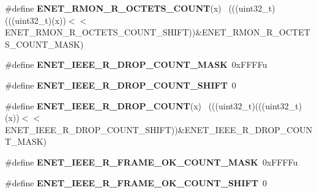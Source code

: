 \begin{DoxyCompactItemize}
\item 
\hypertarget{group___e_n_e_t___register___masks_ga1688acf267de0ee29e9a179f6f59c606}{}\#define {\bfseries E\+N\+E\+T\+\_\+\+R\+M\+O\+N\+\_\+\+R\+\_\+\+O\+C\+T\+E\+T\+S\+\_\+\+C\+O\+U\+N\+T}(x)                        ~(((uint32\+\_\+t)(((uint32\+\_\+t)(x))$<$$<$E\+N\+E\+T\+\_\+\+R\+M\+O\+N\+\_\+\+R\+\_\+\+O\+C\+T\+E\+T\+S\+\_\+\+C\+O\+U\+N\+T\+\_\+\+S\+H\+I\+F\+T))\&E\+N\+E\+T\+\_\+\+R\+M\+O\+N\+\_\+\+R\+\_\+\+O\+C\+T\+E\+T\+S\+\_\+\+C\+O\+U\+N\+T\+\_\+\+M\+A\+S\+K)\label{group___e_n_e_t___register___masks_ga1688acf267de0ee29e9a179f6f59c606}

\item 
\hypertarget{group___e_n_e_t___register___masks_ga40514ce83587f1cd466ecbe7b007e571}{}\#define {\bfseries E\+N\+E\+T\+\_\+\+I\+E\+E\+E\+\_\+\+R\+\_\+\+D\+R\+O\+P\+\_\+\+C\+O\+U\+N\+T\+\_\+\+M\+A\+S\+K}~0x\+F\+F\+F\+Fu\label{group___e_n_e_t___register___masks_ga40514ce83587f1cd466ecbe7b007e571}

\item 
\hypertarget{group___e_n_e_t___register___masks_gadfe517b4bb1358a8934a04c3bfe94d9d}{}\#define {\bfseries E\+N\+E\+T\+\_\+\+I\+E\+E\+E\+\_\+\+R\+\_\+\+D\+R\+O\+P\+\_\+\+C\+O\+U\+N\+T\+\_\+\+S\+H\+I\+F\+T}~0\label{group___e_n_e_t___register___masks_gadfe517b4bb1358a8934a04c3bfe94d9d}

\item 
\hypertarget{group___e_n_e_t___register___masks_gaaa3224079808337c73c1441256aee44f}{}\#define {\bfseries E\+N\+E\+T\+\_\+\+I\+E\+E\+E\+\_\+\+R\+\_\+\+D\+R\+O\+P\+\_\+\+C\+O\+U\+N\+T}(x)                            ~(((uint32\+\_\+t)(((uint32\+\_\+t)(x))$<$$<$E\+N\+E\+T\+\_\+\+I\+E\+E\+E\+\_\+\+R\+\_\+\+D\+R\+O\+P\+\_\+\+C\+O\+U\+N\+T\+\_\+\+S\+H\+I\+F\+T))\&E\+N\+E\+T\+\_\+\+I\+E\+E\+E\+\_\+\+R\+\_\+\+D\+R\+O\+P\+\_\+\+C\+O\+U\+N\+T\+\_\+\+M\+A\+S\+K)\label{group___e_n_e_t___register___masks_gaaa3224079808337c73c1441256aee44f}

\item 
\hypertarget{group___e_n_e_t___register___masks_ga61cc0d2a38667a1263e2233c7f9a4270}{}\#define {\bfseries E\+N\+E\+T\+\_\+\+I\+E\+E\+E\+\_\+\+R\+\_\+\+F\+R\+A\+M\+E\+\_\+\+O\+K\+\_\+\+C\+O\+U\+N\+T\+\_\+\+M\+A\+S\+K}~0x\+F\+F\+F\+Fu\label{group___e_n_e_t___register___masks_ga61cc0d2a38667a1263e2233c7f9a4270}

\item 
\hypertarget{group___e_n_e_t___register___masks_ga18b9d145aab58ab10347846c95e949a3}{}\#define {\bfseries E\+N\+E\+T\+\_\+\+I\+E\+E\+E\+\_\+\+R\+\_\+\+F\+R\+A\+M\+E\+\_\+\+O\+K\+\_\+\+C\+O\+U\+N\+T\+\_\+\+S\+H\+I\+F\+T}~0\label{group___e_n_e_t___register___masks_ga18b9d145aab58ab10347846c95e949a3}


\end{DoxyCompactItemize}
